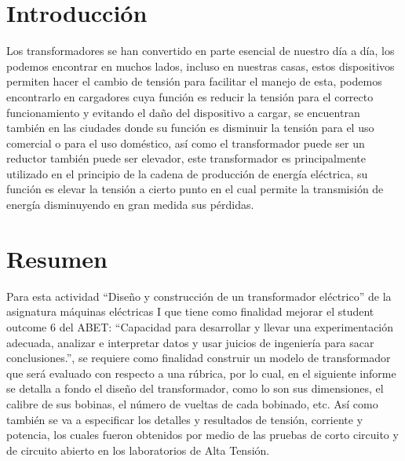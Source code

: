 \section{Introducción}
Los transformadores se han convertido en parte esencial de nuestro día a día, los podemos encontrar en muchos lados, incluso en nuestras casas, estos dispositivos permiten hacer el cambio de tensión para facilitar el manejo de esta, podemos encontrarlo en cargadores cuya función es reducir la tensión para el correcto funcionamiento y evitando el daño del dispositivo a cargar, se encuentran también en las ciudades donde su función es disminuir la tensión para el uso comercial o para el uso doméstico, así como el transformador puede ser un reductor también puede ser elevador, este transformador es principalmente utilizado en el principio de la cadena de producción de energía eléctrica, su función es elevar la tensión a cierto punto en el cual permite la transmisión de energía disminuyendo en gran medida sus pérdidas.

\section{Resumen}
Para esta actividad “Diseño y construcción de un transformador eléctrico” de la asignatura máquinas eléctricas I que tiene como finalidad mejorar el student outcome 6 del ABET: “Capacidad para desarrollar y llevar una experimentación adecuada, analizar e interpretar datos y usar juicios de ingeniería para sacar conclusiones.”, se requiere como finalidad construir un modelo de transformador que será evaluado con respecto a una rúbrica, por lo cual, en el siguiente informe se detalla a fondo el diseño del transformador, como lo son sus dimensiones, el calibre de sus bobinas, el número de vueltas de cada bobinado, etc. Así como también se va a especificar los detalles y resultados de tensión, corriente y potencia, los cuales fueron obtenidos por medio de las pruebas de corto circuito y de circuito abierto en los laboratorios de Alta Tensión.

